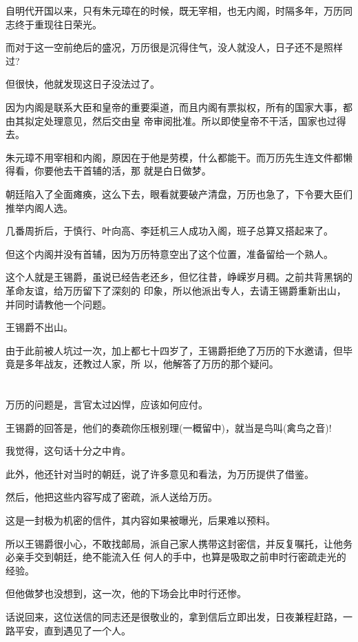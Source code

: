 \documentclass[11pt,a4paper,onecolumn]{article}
\begin{document}
自明代开国以来，只有朱元璋在的时候，既无宰相，也无内阁，时隔多年，万历同志终于重现往日荣光。

而对于这一空前绝后的盛况，万历很是沉得住气，没人就没人，日子还不是照样过?

但很快，他就发现这日子没法过了。

因为内阁是联系大臣和皇帝的重要渠道，而且内阁有票拟权，所有的国家大事，都由其拟定处理意见，然后交由皇
帝审阅批准。所以即使皇帝不干活，国家也过得去。

朱元璋不用宰相和内阁，原因在于他是劳模，什么都能干。而万历先生连文件都懒得看，你要他去干首辅的活，那
就是白日做梦。

朝廷陷入了全面瘫痪，这么下去，眼看就要破产清盘，万历也急了，下令要大臣们推举内阁人选。

几番周折后，于慎行、叶向高、李廷机三人成功入阁，班子总算又搭起来了。

但这个内阁并没有首辅，因为万历特意空出了这个位置，准备留给一个熟人。

这个人就是王锡爵，虽说已经告老还乡，但忆往昔，峥嵘岁月稠。之前共背黑锅的革命友谊，给万历留下了深刻的
印象，所以他派出专人，去请王锡爵重新出山，并同时请教他一个问题。

王锡爵不出山。

由于此前被人坑过一次，加上都七十四岁了，王锡爵拒绝了万历的下水邀请，但毕竟是多年战友，还教过人家，所
以，他解答了万历的那个疑问。

\section[\thesection]{}

万历的问题是，言官太过凶悍，应该如何应付。

王锡爵的回答是，他们的奏疏你压根别理(一概留中)，就当是鸟叫(禽鸟之音)!

我觉得，这句话十分之中肯。

此外，他还针对当时的朝廷，说了许多意见和看法，为万历提供了借鉴。

然后，他把这些内容写成了密疏，派人送给万历。

这是一封极为机密的信件，其内容如果被曝光，后果难以预料。

所以王锡爵很小心，不敢找邮局，派自己家人携带这封密信，并反复嘱托，让他务必亲手交到朝廷，绝不能流入任
何人的手中，也算是吸取之前申时行密疏走光的经验。

但他做梦也没想到，这一次，他的下场会比申时行还惨。

话说回来，这位送信的同志还是很敬业的，拿到信后立即出发，日夜兼程赶路，一路平安，直到遇见了一个人。
\end{document}
